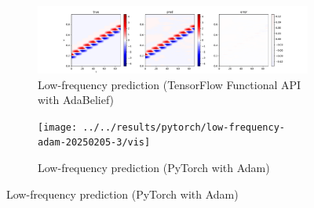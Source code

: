 \documentclass[10pt,journal,compsoc,onecolumn]{IEEEtran}
\begin{document}
\begin{figure}[t]
    \centering
    \begin{subfigure}[b]{0.7\linewidth}
        \includegraphics[width=\linewidth]{../../results/functional/low-frequency-adabelief-20250206-1105-1/vis}
        \caption{Low-frequency prediction (TensorFlow Functional API with AdaBelief)}
    \end{subfigure}
    
    \begin{subfigure}[b]{0.7\linewidth}
        \texttt{[image: ../../results/pytorch/low-frequency-adam-20250205-3/vis]}
        \caption{Low-frequency prediction (PyTorch with Adam)}
    \end{subfigure}
    

\end{figure}
\end{document}

